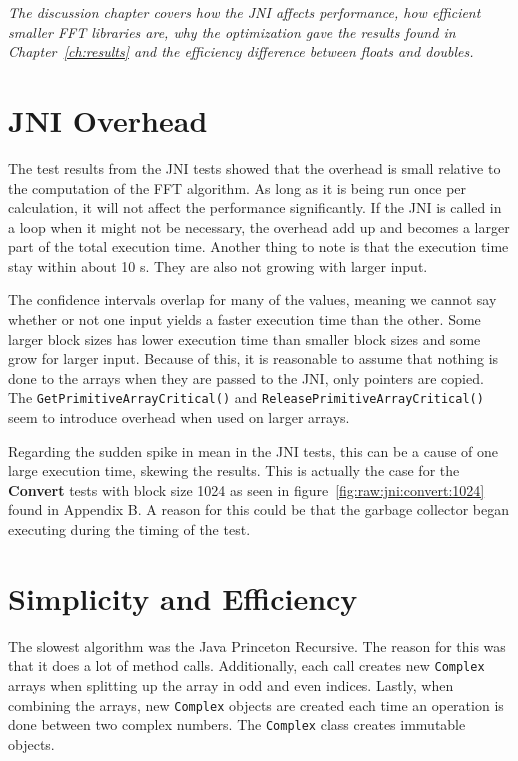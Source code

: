 \textit{The discussion chapter covers how the JNI affects performance, how efficient smaller FFT libraries are, why the optimization gave the results found in Chapter~\ref{ch:results} and the efficiency difference between floats and doubles.}

\section{JNI Overhead}
The test results from the JNI tests showed that the overhead is small relative to the computation of the FFT algorithm. As long as it is being run once per calculation, it will not affect the performance significantly. If the JNI is called in a loop when it might not be necessary, the overhead add up and becomes a larger part of the total execution time. Another thing to note is that the execution time stay within about 10 \textmu s. They are also not growing with larger input.

The confidence intervals overlap for many of the values, meaning we cannot say whether or not one input yields a faster execution time than the other. Some larger block sizes has lower execution time than smaller block sizes and some grow for larger input. Because of this, it is reasonable to assume that nothing is done to the arrays when they are passed to the JNI, only pointers are copied. The \texttt{GetPrimitiveArrayCritical()} and \texttt{ReleasePrimitiveArrayCritical()} seem to introduce overhead when used on larger arrays. %

Regarding the sudden spike in mean in the JNI tests, this can be a cause of one large execution time, skewing the results. This is actually the case for the \textbf{Convert} tests with block size 1024 as seen in figure~\ref{fig:raw:jni:convert:1024} found in Appendix B. A reason for this could be that the garbage collector began executing during the timing of the test.


\section{Simplicity and Efficiency} %

The slowest algorithm was the Java Princeton Recursive. The reason for this was that it does a lot of method calls. Additionally, each call creates new \texttt{Complex} arrays when splitting up the array in odd and even indices. Lastly, when combining the arrays, new \texttt{Complex} objects are created each time an operation is done between two complex numbers. The \texttt{Complex} class creates immutable objects.

